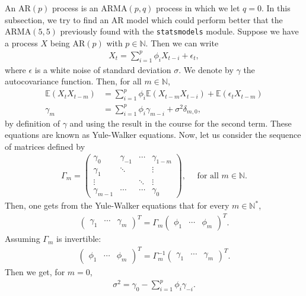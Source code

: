 \documentclass[11pt, a4paper]{article}
\theoremstyle{remark}
\newcommand{\E}{\mathbb{E}}
\newcommand{\ARMA}{\mathrm{ARMA}}
\newcommand{\AR}{\mathrm{AR}}
\newcommand{\N}{\mathbb{N}}
\newcommand{\code}[1]{\texttt{#1}}
\begin{document}
An $\AR(p)$ process is an $\ARMA(p,q)$ process in which we let $q = 0$. In this subsection, we try to find an $\AR$ model which could perform better that the $\ARMA(5,5)$ previously found with the \code{statsmodels} module. Suppose we have a process $X$ being $\AR(p)$ with $p \in \N$. Then we can write
\begin{align*}
X_t = \sum_{i=1}^p \phi_i X_{t-i} + \epsilon_t,
\end{align*}
where $\epsilon$ is a white noise of standard deviation $\sigma$. We denote by $\gamma$ the autocovariance function. Then, for all $m \in \N$,
\begin{align*}
\E(X_t X_{t-m}) & = \sum_{i=1}^p \phi_i \E(X_{t-m} X_{t-i}) + \E(\epsilon_t X_{t-m}) \\
\gamma_m & = \sum_{i=1}^p \phi_i \gamma_{m-i} + \sigma^2 \delta_{m, 0},
\end{align*}
by definition of $\gamma$ and using the result in the course for the second term. These equations are known as Yule-Walker equations. Now, let us consider the sequence of matrices defined by
\begin{align*}
\Gamma_m = \begin{pmatrix}
\gamma_0 & \gamma_{-1} & \cdots & \gamma_{1-m} \\
\gamma_1 & \ddots & & \vdots \\
\vdots & & \ddots & \vdots \\
\gamma_{m-1} & \cdots & \cdots & \gamma_0
\end{pmatrix}, \quad \text{ for all } m \in \N.
\end{align*}
Then, one gets from the Yule-Walker equations that for every $m \in \N^*$,
\begin{align*}
\begin{pmatrix}
\gamma_1 & \cdots & \gamma_m
\end{pmatrix}^T = \Gamma_m \begin{pmatrix}
\phi_1 & \cdots & \phi_m
\end{pmatrix}^T.
\end{align*}
Assuming $\Gamma_m$ is invertible:
\begin{align*}
\begin{pmatrix}
\phi_1 & \cdots & \phi_m
\end{pmatrix}^T = \Gamma_m^{-1} \begin{pmatrix}
\gamma_1 & \cdots & \gamma_m
\end{pmatrix}^T.
\end{align*}
Then we get, for $m=0$,
\begin{align*}
\sigma^2 = \gamma_0 - \sum_{i=1}^p \phi_i \gamma_{-i}.
\end{align*}
\end{document}

